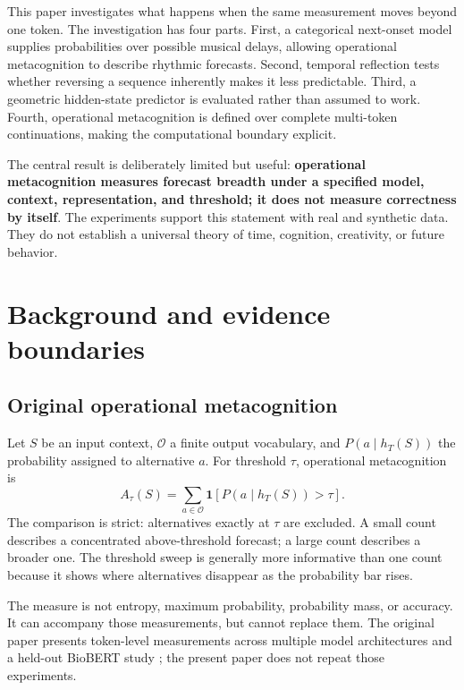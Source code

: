 \documentclass[11pt,a4paper]{article}
\begin{document}
This paper investigates what happens when the same measurement moves beyond one token. The investigation has four parts. First, a categorical next-onset model supplies probabilities over possible musical delays, allowing operational metacognition to describe rhythmic forecasts. Second, temporal reflection tests whether reversing a sequence inherently makes it less predictable. Third, a geometric hidden-state predictor is evaluated rather than assumed to work. Fourth, operational metacognition is defined over complete multi-token continuations, making the computational boundary explicit.

The central result is deliberately limited but useful: \textbf{operational metacognition measures forecast breadth under a specified model, context, representation, and threshold; it does not measure correctness by itself}. The experiments support this statement with real and synthetic data. They do not establish a universal theory of time, cognition, creativity, or future behavior.

\section{Background and evidence boundaries}
\subsection{Original operational metacognition}
Let $S$ be an input context, $\mathcal{O}$ a finite output vocabulary, and $P(a\mid h_T(S))$ the probability assigned to alternative $a$. For threshold $\tau$, operational metacognition is
\begin{equation}
A_\tau(S)=\sum_{a\in\mathcal{O}}\mathbf{1}\!\left[P(a\mid h_T(S))>\tau\right].
\label{eq:original-volume}
\end{equation}
The comparison is strict: alternatives exactly at $\tau$ are excluded. A small count describes a concentrated above-threshold forecast; a large count describes a broader one. The threshold sweep is generally more informative than one count because it shows where alternatives disappear as the probability bar rises.

The measure is not entropy, maximum probability, probability mass, or accuracy. It can accompany those measurements, but cannot replace them. The original paper presents token-level measurements across multiple model architectures and a held-out BioBERT study \cite{kloster2026significance}; the present paper does not repeat those experiments.
\end{document}
